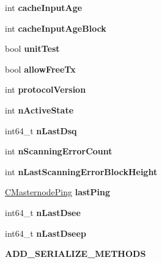 \begin{DoxyCompactItemize}
int {\bfseries cache\+Input\+Age}
\item 
\mbox{\label{class_c_masternode_a14a1fa702e72d7859d4e06fe3f31d036}} 
int {\bfseries cache\+Input\+Age\+Block}
\item 
\mbox{\label{class_c_masternode_ab6001773c4885c29c3ccd1729f55eacb}} 
bool {\bfseries unit\+Test}
\item 
\mbox{\label{class_c_masternode_a44360a02c580e7c774d379fd263be157}} 
bool {\bfseries allow\+Free\+Tx}
\item 
\mbox{\label{class_c_masternode_a76c3316f06fb2b258b37c4ed2b4c2afb}} 
int {\bfseries protocol\+Version}
\item 
\mbox{\label{class_c_masternode_a41efbc881997e3df19dcf0e430c76d82}} 
int {\bfseries n\+Active\+State}
\item 
\mbox{\label{class_c_masternode_ab9d3bfad4bfc61f9113b3adbc792bbe2}} 
int64\+\_\+t {\bfseries n\+Last\+Dsq}
\item 
\mbox{\label{class_c_masternode_a6716c39feb8e0e8cecc97bb732728ff4}} 
int {\bfseries n\+Scanning\+Error\+Count}
\item 
\mbox{\label{class_c_masternode_a091abf16cb7ac7090705a6705a044f76}} 
int {\bfseries n\+Last\+Scanning\+Error\+Block\+Height}
\item 
\mbox{\label{class_c_masternode_a114a0ba01b5dfa4d785380007edd31f3}} 
\mbox{\hyperlink{class_c_masternode_ping}{C\+Masternode\+Ping}} {\bfseries last\+Ping}
\item 
\mbox{\label{class_c_masternode_aec347df3a1a59ece2339043a9ab3d552}} 
int64\+\_\+t {\bfseries n\+Last\+Dsee}
\item 
\mbox{\label{class_c_masternode_a5ce4de6d60de4a34bdbef084e04e6d04}} 
int64\+\_\+t {\bfseries n\+Last\+Dseep}
\item 
\mbox{\label{class_c_masternode_adbd6c5c459a6450cd724f88d62b5948f}} 
{\bfseries A\+D\+D\+\_\+\+S\+E\+R\+I\+A\+L\+I\+Z\+E\+\_\+\+M\+E\+T\+H\+O\+DS}
\end{DoxyCompactItemize}
